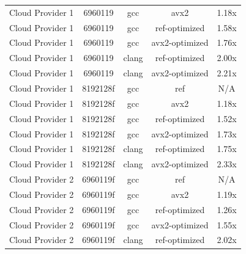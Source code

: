\begin{table}[H]
\begin{tabularx}{\linewidth}{X c c c c}
            Cloud Provider 1 &              6960119 &                  gcc &                 avx2 &                1.18x\\
            Cloud Provider 1 &              6960119 &                  gcc &        ref-optimized &                1.58x\\
            Cloud Provider 1 &              6960119 &                  gcc &       avx2-optimized &                1.76x\\
            Cloud Provider 1 &              6960119 &                clang &        ref-optimized &                2.00x\\
            Cloud Provider 1 &              6960119 &                clang &       avx2-optimized &                2.21x\\
            Cloud Provider 1 &             8192128f &                  gcc &                  ref &                  N/A\\
            Cloud Provider 1 &             8192128f &                  gcc &                 avx2 &                1.18x\\
            Cloud Provider 1 &             8192128f &                  gcc &        ref-optimized &                1.52x\\
            Cloud Provider 1 &             8192128f &                  gcc &       avx2-optimized &                1.73x\\
            Cloud Provider 1 &             8192128f &                clang &        ref-optimized &                1.75x\\
            Cloud Provider 1 &             8192128f &                clang &       avx2-optimized &                2.33x\\
            Cloud Provider 2 &             6960119f &                  gcc &                  ref &                  N/A\\
            Cloud Provider 2 &             6960119f &                  gcc &                 avx2 &                1.19x\\
            Cloud Provider 2 &             6960119f &                  gcc &        ref-optimized &                1.26x\\
            Cloud Provider 2 &             6960119f &                  gcc &       avx2-optimized &                1.55x\\
            Cloud Provider 2 &             6960119f &                clang &        ref-optimized &                2.02x\\

\end{tabularx}
\end{table}
